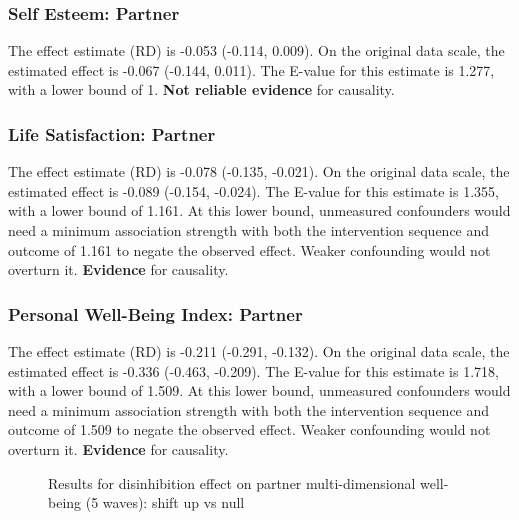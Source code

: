 \documentclass[
  singlecolumn]{article}
\begin{document}
\subsubsection{Self Esteem: Partner}\label{self-esteem-partner-11}

The effect estimate (RD) is -0.053 (-0.114, 0.009). On the original data
scale, the estimated effect is -0.067 (-0.144, 0.011). The E-value for
this estimate is 1.277, with a lower bound of 1. \textbf{Not reliable
evidence} for causality.

\subsubsection{Life Satisfaction:
Partner}\label{life-satisfaction-partner-11}

The effect estimate (RD) is -0.078 (-0.135, -0.021). On the original
data scale, the estimated effect is -0.089 (-0.154, -0.024). The E-value
for this estimate is 1.355, with a lower bound of 1.161. At this lower
bound, unmeasured confounders would need a minimum association strength
with both the intervention sequence and outcome of 1.161 to negate the
observed effect. Weaker confounding would not overturn it.
\textbf{Evidence} for causality.

\subsubsection{Personal Well-Being Index:
Partner}\label{personal-well-being-index-partner-11}

The effect estimate (RD) is -0.211 (-0.291, -0.132). On the original
data scale, the estimated effect is -0.336 (-0.463, -0.209). The E-value
for this estimate is 1.718, with a lower bound of 1.509. At this lower
bound, unmeasured confounders would need a minimum association strength
with both the intervention sequence and outcome of 1.509 to negate the
observed effect. Weaker confounding would not overturn it.
\textbf{Evidence} for causality.

\begin{figure}


\caption{\label{fig-results-disinhibition-partner-up-long}Results for
disinhibition effect on partner multi-dimensional well-being (5 waves):
shift up vs null}

\end{figure}%
\end{document}
